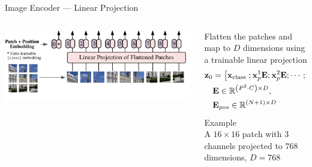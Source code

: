 \documentclass[aspectratio=169,xcolor=dvipsnames]{beamer}
\begin{document}
\begin{frame}{Image Encoder --- Linear Projection}

    \begin{columns}
        \begin{column}{0.5\textwidth}
        \includegraphics[width=\textwidth]{figures/patches_vision_transformer.png}
        \end{column}
    
        \begin{column}{0.5\textwidth}
        Flatten the patches and map to $D$ dimensions using a trainable linear projection\\
        \begin{align*}
            \mathbf{z}_0
            &=\left[\mathbf{x}_{\text {class }} ; \mathbf{x}_p^1 \mathbf{E} ; \mathbf{x}_p^2 \mathbf{E} ; \cdots ; \mathbf{x}_p^N \mathbf{E}\right]+\mathbf{E}_{p o s}, \\ 
            \bigskip
            &\mathbf{E} \in \mathbb{R}^{\left(P^2 \cdot C\right) \times D}, \\
            &\mathbf{E}_{p o s} \in \mathbb{R}^{(N+1) \times D}
            \end{align*}
        Example\\
        A $16\times 16$ patch with $3$ channels projected to $768$ dimensions, $D=768$
    \end{column}
    \end{columns}
    
    \end{frame}

    
\end{document}
